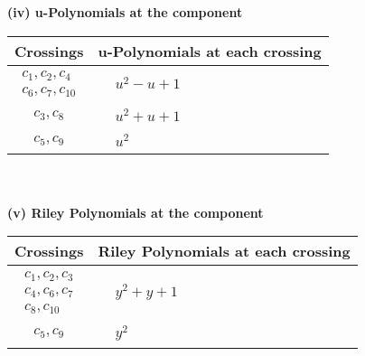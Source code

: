 \documentclass[1p]{elsarticle_modified}
\theoremstyle{definition}
\begin{document}
\newpage\renewcommand{\arraystretch}{1}
\flushleft \textbf{(iv) u-Polynomials at the component}\newline \\
\begin{tabular}{m{50pt}|m{274pt}}
Crossings & \hspace{64pt}u-Polynomials at each crossing \\
\hline $$\begin{aligned}c_{1},c_{2},c_{4}\\c_{6},c_{7},c_{10}\end{aligned}$$&$\begin{aligned}
&u^2- u+1
\end{aligned}$\\
\hline $$\begin{aligned}c_{3},c_{8}\end{aligned}$$&$\begin{aligned}
&u^2+u+1
\end{aligned}$\\
\hline $$\begin{aligned}c_{5},c_{9}\end{aligned}$$&$\begin{aligned}
&u^2
\end{aligned}$\\
\hline
\end{tabular}\\~\\
\newpage\renewcommand{\arraystretch}{1}
\flushleft \textbf{(v) Riley Polynomials at the component}\newline \\
\begin{tabular}{m{50pt}|m{274pt}}
Crossings & \hspace{64pt}Riley Polynomials at each crossing \\
\hline $$\begin{aligned}c_{1},c_{2},c_{3}\\c_{4},c_{6},c_{7}\\c_{8},c_{10}\end{aligned}$$&$\begin{aligned}
&y^2+y+1
\end{aligned}$\\
\hline $$\begin{aligned}c_{5},c_{9}\end{aligned}$$&$\begin{aligned}
&y^2
\end{aligned}$\\
\hline
\end{tabular}\\~\\
\end{document}
